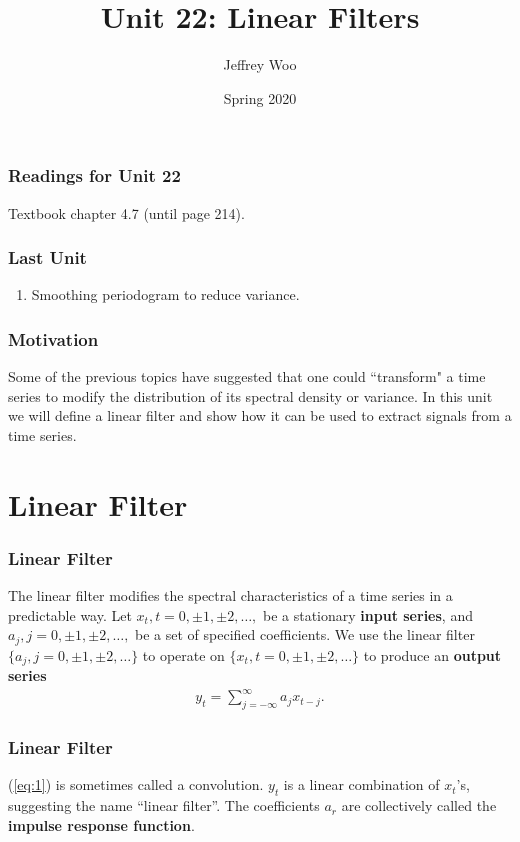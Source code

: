 \documentclass[%
xcolor=pdftex]{beamer}
\title{Unit 22: Linear Filters}
\author[STAT 5170: Applied Time Series, Unit 24]{Jeffrey Woo}
\institute{Department of Statistics, University of Virginia}
\date{Spring 2020}
\begin{document}
\frame{\titlepage}


\begin{frame}
\frametitle{Readings for Unit 22}

Textbook chapter 4.7 (until page 214).

\end{frame}


\begin{frame}
\frametitle{Last Unit}
\begin{enumerate}
\item Smoothing periodogram to reduce variance.
\end{enumerate}
\end{frame}

\begin{frame}
\frametitle{Motivation}

Some of the previous topics have suggested that one could ``transform" a time series to modify the distribution of its spectral density or variance. In this unit we will define a linear filter and show how it can be used to extract signals from a time series.


\end{frame}

\section{Linear Filter}
\frame{\tableofcontents[currentsection]}

\begin{frame}
\frametitle{Linear Filter}

The linear filter modifies the spectral characteristics of a time series in a predictable way. Let  $x_t,t=0,\pm 1,\pm 2,\ldots,$ be a stationary \textbf{input
series}, and $a_j,j=0,\pm 1,\pm 2,\ldots,$ be a set of specified
coefficients. We use the linear filter $\{a_j,j=0,\pm 1, \pm
2,\ldots\}$ to operate on $\{x_t,t=0,\pm 1, \pm 2,\ldots\}$ to
produce an \textbf{output series}
\begin{eqnarray}\label{eq:1}
y_t = \sum^\infty_{j=-\infty} a_j x_{t-j}.
\end{eqnarray}



\end{frame}

\begin{frame}
\frametitle{Linear Filter}

(\ref{eq:1}) is sometimes called a convolution.  $y_t$ is a linear combination of $x_t$'s, suggesting the
name ``linear filter''. The coefficients $a_r$ are collectively
called the {\bf impulse response function}.

\end{frame}
\end{document}
